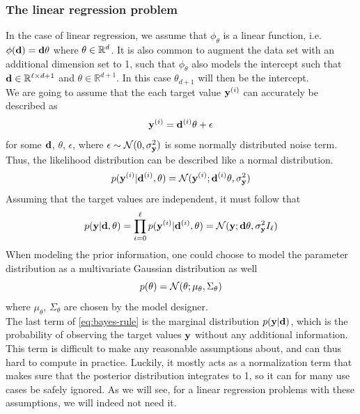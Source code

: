 \subsubsection{The linear regression problem}
In the case of linear regression, we assume that $\phi_\theta$ is a linear function, i.e. $\phi(\mathbf{d}) = \mathbf{d}\mathbf{\theta}$ where $\mathbf{\theta}\in \mathbb{R}^{d}$. 
It is also common to augment the data set with an additional dimension set to 1, such that $\phi_\theta$ also models the intercept such that $\mathbf{d} \in \mathbb{R}^{\ell \times d + 1}$ and $\theta \in \mathbb{R}^{d + 1}$. In this case $\theta_{d+1}$ will then be the intercept.\\

We are going to assume that the each target value $\mathbf{y}^{(i)}$ can accurately be described as
\begin{equation}
  \label{eq:likelihood-generating}
  \mathbf{y}^{(i)} = \mathbf{d}^{(i)}\theta + \epsilon
\end{equation}
for some $\mathbf{d}$, $\theta$, $\epsilon$, where $\epsilon \sim \mathcal{N}(0, \sigma^2_{\mathbf{y}})$ is some normally distributed noise term.
Thus, the likelihood distribution can be described like a normal distribution.
\begin{equation}
  \label{eq:likelihood-single}
  p(\textbf{y}^{(i)} | \mathbf{d}^{(i)}, \mathbf{\theta}) = \mathcal{N}(\mathbf{y}^{(i)}; \mathbf{d}^{(i)}\mathbf{\theta}, \sigma^2_{\mathbf{y}})
\end{equation}
Assuming that the target values are independent, it must follow that
\begin{equation}
  \label{eq:likelihood}
  p(\textbf{y} | \mathbf{d}, \mathbf{\theta}) = \prod_{i=0}^\ell p(\textbf{y}^{(i)} | \mathbf{d}^{(i)}, \mathbf{\theta}) = \mathcal{N}(\mathbf{y}; \mathbf{d}\mathbf{\theta}, \sigma^2_{\mathbf{y}}I_\ell)
\end{equation}
When modeling the prior information, one could choose to model the parameter distribution as a multivariate Gaussian distribution as well
\begin{equation}
  \label{eq:prior}
  p(\mathbf{\theta}) = \mathcal{N}(\theta; \mu_{\theta}, \Sigma_\theta)
\end{equation}
where $\mu_\theta$, $\Sigma_\theta$ are chosen by the model designer. \\
The last term of \eqref{eq:bayes-rule} is the marginal distribution $p(\mathbf{y}| \mathbf{d})$, which is the probability of observing the target values $\mathbf{y}$ without any additional information. 
This term is difficult to make any reasonable assumptions about, and can thus hard to compute in practice.
Luckily, it mostly acts as a normalization term that makes sure that the posterior distribution integrates to 1, so it can for many use cases be safely ignored.
As we will see, for a linear regression problems with these assumptions, we will indeed not need it.
